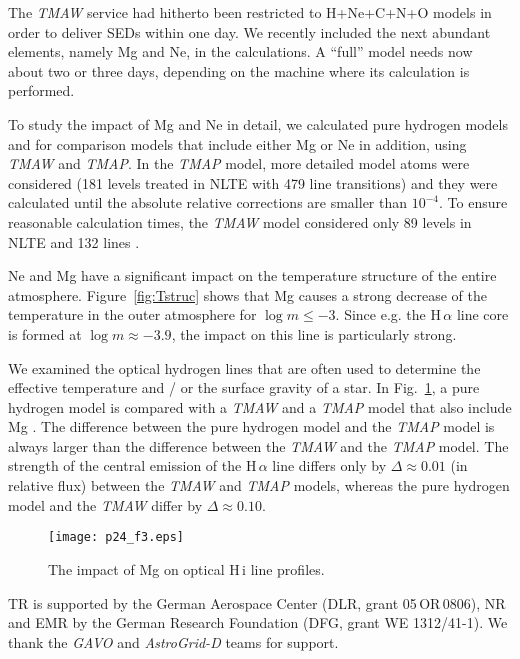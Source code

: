 \documentclass[11pt,twoside]{article}
\begin{document}
The \emph{TMAW} service had hitherto been restricted
to H+Ne+C+N+O models in order to deliver SEDs within one day.
We recently included the next abundant elements, namely Mg and Ne,
in the calculations. A ``full'' model needs now about two or three days,
depending on the machine where its calculation is performed.

To study the impact of Mg and Ne in detail, we calculated pure hydrogen models 
and for comparison models that include either Mg or Ne in addition, using 
\emph{TMAW} and \emph{TMAP}. In the \emph{TMAP} model, more detailed model atoms 
were considered (181 levels treated in NLTE with 479 line transitions)
and they were calculated until the absolute relative corrections are smaller 
than $10^{-4}$. To ensure reasonable calculation times,  the \emph{TMAW} model 
considered only 89 levels in NLTE and 132 lines \citep[cf\@.][]{rauchringat2012}.

Ne and Mg have a significant impact on the temperature structure of the entire atmosphere.
Figure~\ref{fig:Tstruc} shows that Mg causes a strong decrease of the temperature in the outer
atmosphere for $\log m \leq -3$. Since e.g\@. the H\,$\alpha$ line core is formed at 
$\log m \approx -3.9$, the impact on this line is particularly strong.

We examined the optical hydrogen lines that are often used to determine the effective 
temperature and / or the surface gravity of a star. In Fig.~\ref{fig:HMg}, a pure 
hydrogen model is compared with a \emph{TMAW} and a \emph{TMAP} model that also include 
Mg \citep[$T_\mathrm{eff}=60\,\mathrm{kK}$, $\log g = 7$, solar abundances,][]{asplundetal2009}.
The difference between the pure hydrogen model and the 
\emph{TMAP} model is always larger than the difference between the \emph{TMAW} and 
the \emph{TMAP} model. The strength of the central emission of the H\,$\alpha$ line differs 
only by $\Delta \approx 0.01$ (in relative flux) between the \emph{TMAW} and \emph{TMAP} models, 
whereas the pure hydrogen model and the \emph{TMAW} differ by $\Delta \approx 0.10$.


\begin{figure}[ht!]\centering
\texttt{[image: p24\_f3.eps]}
\caption{The impact of Mg on optical H\,{\sc i} line profiles.}
\label{fig:HMg}
\end{figure}


\acknowledgements 
TR is supported by the German Aerospace Center (DLR, grant 05\,OR\,0806), 
NR and EMR by the German Research Foundation (DFG, grant WE 1312/41-1).
We thank the \emph{GAVO} and \emph{AstroGrid-D} teams for support.



\end{document}
